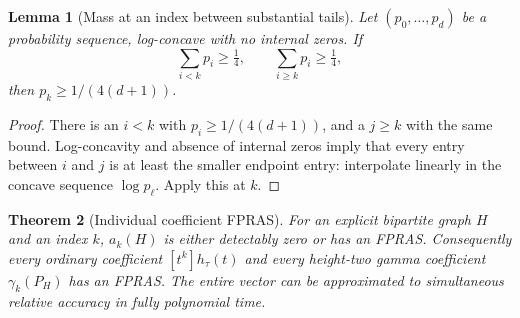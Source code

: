 \documentclass[11pt]{article}
\numberwithin{equation}{section}
\newtheorem{theorem}{Theorem}[section]
\newtheorem{lemma}[theorem]{Lemma}
\theoremstyle{definition}
\begin{document}
\begin{lemma}[Mass at an index between substantial tails]\label{lor:lem:mass}
Let $(p_0,\ldots,p_d)$ be a probability sequence, log-concave with no
internal zeros. If
\[
 \sum_{i<k}p_i\ge\tfrac14,
 \qquad \sum_{i\ge k}p_i\ge\tfrac14,
\]
then $p_k\ge1/(4(d+1))$.
\end{lemma}
\begin{proof}
There is an $i<k$ with $p_i\ge1/(4(d+1))$, and a $j\ge k$ with the same
bound. Log-concavity and absence of internal zeros imply that every entry
between $i$ and $j$ is at least the smaller endpoint entry: interpolate
linearly in the concave sequence $\log p_\ell$. Apply this at $k$.
\end{proof}

\begin{theorem}[Individual coefficient FPRAS]\label{lor:thm:coefficients}
For an explicit bipartite graph $H$ and an index $k$, $a_k(H)$ is either
detectably zero or has an FPRAS. Consequently every ordinary coefficient
$[t^k]h_\tau(t)$ and every height-two gamma coefficient
$\gamma_k(P_H)$ has an FPRAS. The entire vector can be approximated to
simultaneous relative accuracy in fully polynomial time.
\end{theorem}
\end{document}
